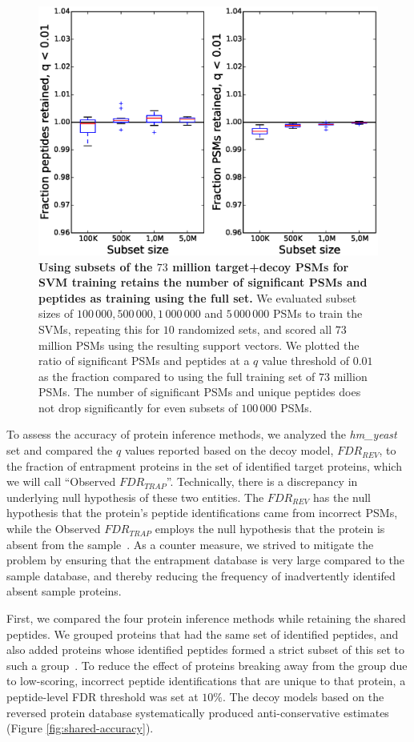 \documentclass{article}
\begin{document}
\begin{figure}[!htp]
\begin{center}
\includegraphics[width=0.6\linewidth]{./img/subset-performance}
\caption{\label{fig:subset}\textbf{Using subsets of the $73$ million
target+decoy PSMs for SVM training retains the number of significant
PSMs and peptides as training using the full set.} We evaluated subset
sizes of $100\,000, 500\,000, 1\,000\,000$ and $5\,000\,000$ PSMs to
train the SVMs, repeating this for $10$ randomized sets, and scored
all $73$ million PSMs using the resulting support vectors. We plotted
the ratio of significant PSMs and peptides at a $q$ value threshold of
$0.01$ as the fraction compared to using the full training set of $73$
million PSMs. The number of significant PSMs and unique peptides does
not drop significantly for even subsets of $100\,000$ PSMs.}
\end{center}
\end{figure}

To assess the accuracy of protein inference methods, we analyzed the
{\em hm\_yeast} set and compared the $q$ values reported based on the
decoy model, $FDR_{REV}$, to the fraction of entrapment proteins in
the set of identified target proteins, which we will call ``Observed
$FDR_{TRAP}$''. Technically, there is a discrepancy in underlying null
hypothesis of these two entities. The $FDR_{REV}$ has the null
hypothesis that the protein's peptide identifications came from
incorrect PSMs, while the Observed $FDR_{TRAP}$ employs the null
hypothesis that the protein is absent from the sample~\cite{the:how}.
As a counter measure, we strived to mitigate the problem by ensuring
that the entrapment database is very large compared to the sample
database, and thereby reducing the frequency of inadvertently
identifed absent sample proteins.

First, we compared the four protein inference methods while retaining
the shared peptides. We grouped proteins that had the same set of
identified peptides, and also added proteins whose identified peptides
formed a strict subset of this set to such a
group~\cite{serang2012review}. To reduce the effect of proteins
breaking away from the group due to low-scoring, incorrect peptide
identifications that are unique to that protein, a peptide-level FDR
threshold was set at $10\%$. The decoy models based on the reversed
protein database systematically produced anti-conservative estimates
(Figure \ref{fig:shared-accuracy}).
\end{document}
